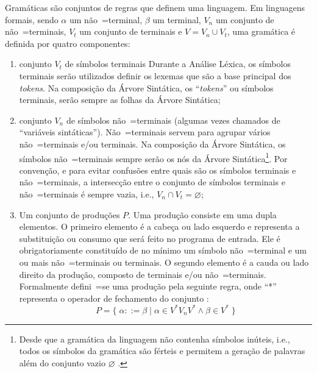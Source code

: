 Gramáticas são conjuntos de regras que definem uma linguagem.
Em linguagens formais,
sendo $\alpha$ um não~=terminal,
$\beta$ um terminal,
$V_n$ um conjunto de não~=terminais,
$V_t$ um conjunto de terminais e
$V = V_n \cup V_t$,
uma gramática é definida por quatro componentes:
\begin{enumerate}%
    \item {} conjunto $V_t$ de símbolos terminais%
    Durante a Análise Léxica,
    os símbolos terminais serão utilizados definir os lexemas que são a base principal dos \textit{tokens}.
    Na composição da Árvore Sintática,
    os ``\textit{tokens}'' ou símbolos terminais,
    serão sempre as folhas da Árvore Sintática;

    \item {} conjunto $V_n$ de símbolos não~=terminais (algumas vezes chamados de ``variáveis sintáticas'').
    Não~=terminais servem para agrupar vários não~=terminais e\slash{}ou terminais.
    Na composição da Árvore Sintática,
    os símbolos não~=terminais sempre serão os nós da Árvore Sintática\footnote{
    Desde que a gramática da linguagem não contenha símbolos inúteis,
    i.e.,
    todos os símbolos da gramática são férteis e
    permitem a geração de palavras além do conjunto vazio $\varnothing$ \cite{hopcroftBook}.
    }.
    Por convenção,
    e para evitar confusões entre quais são os símbolos terminais e não~=terminais,
    a intersecção entre o conjunto de símbolos terminais e
    não~=terminais é sempre vazia, i.e.,
    $V_n \cap V_t = \varnothing$;

    \item \label{definicaoDeGramatica}Um conjunto de produções $P$.
    Uma produção consiste em uma dupla elementos.
    O primeiro elemento é a cabeça ou lado esquerdo e
    representa a substituição ou
    consumo que será feito no programa de entrada.
    Ele é obrigatoriamente constituído de no mínimo um símbolo não~=terminal e
    um ou mais não~=terminais ou
    terminais.
    O segundo elemento é a cauda ou
    lado direito da produção,
    composto de terminais e\slash{}ou não~=terminais.
    Formalmente defini~=se uma produção pela seguinte regra,
    onde ``*'' representa o operador de fechamento do conjunto \cite{hopcroftBook}:
    $$P = \{\; \alpha ::= \beta \;|\; \alpha \in V^* V_n V^* \land \beta \in V^* \;\}$$


\end{enumerate}
